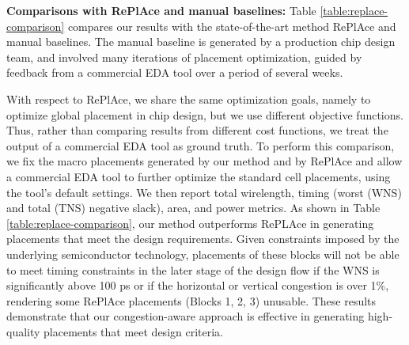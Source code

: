 \documentclass{article}
\begin{document}
\textbf{Comparisons with RePlAce \cite{RePlAce19} and manual baselines:} Table \ref{table:replace-comparison} compares our results with the state-of-the-art method RePlAce \cite{RePlAce19} and manual baselines. The manual baseline is generated by a production chip design team, and involved many iterations of placement optimization, guided by feedback from a commercial EDA tool over a period of several weeks.

With respect to RePlAce, we share the same optimization goals, namely to optimize global placement in chip design, but we use different objective functions. Thus, rather than comparing results from different cost functions, we treat the output of a commercial EDA tool as ground truth. To perform this comparison, we fix the macro placements generated by our method and by RePlAce and allow a commercial EDA tool to further optimize the standard cell placements, using the tool's default settings. We then report total wirelength, timing (worst (WNS) and total (TNS) negative slack), area, and power metrics. As shown in Table \ref{table:replace-comparison}, our method outperforms RePLAce in generating placements that meet the design requirements. Given constraints imposed by the underlying semiconductor technology, placements of these blocks will not be able to meet timing constraints in the later stage of the design flow if the WNS is significantly above 100 ps or if the horizontal or vertical congestion is over 1\%, rendering some RePlAce placements (Blocks 1, 2, 3) unusable. These results demonstrate that our congestion-aware approach is effective in generating high-quality placements that meet design criteria.





\end{document}

